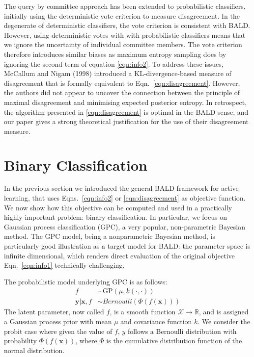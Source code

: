 \documentclass[twoside]{article}
\newcommand{\x}{\bm{x}}
\newcommand{\y}{\bm{y}}
\begin{document}
The query by committee approach has been extended to probabilistic classifiers\cite{EnglesonDagan1995}, initially using the deterministic vote criterion to measure disagreement. In the degenerate of deterministic classifiers, the vote criterion is consistent with BALD. However, using deterministic votes with with probabilistic classifiers means that we ignore the uncertainty of individual committee members. The vote criterion therefore introduces similar biases as maximum entropy sampling does by ignoring the second term of equation \eqref{eqn:info2}. To address these issues, McCallum and Nigam (1998) \cite{McCallumNigam1998} introduced a KL-divergence-based measure of disagreement that is formally equivalent to Eqn.\  \eqref{eqn:disagreement}. However, the authors did not appear to uncover the connection between the principle of maximal disagreement and minimising expected posterior entropy. In retrospect, the algorithm presented in \eqref{eqn:disagreement} is optimal in the BALD sense, and our paper gives a strong theoretical justification for the use of their disagreement measure.

\section{Binary Classification}\label{sec:GPC}

In the previous section we introduced the general BALD framework for active learning, that uses Eqns.\ \eqref{eqn:info2} or \eqref{eqn:disagreement} as objective function. We now show how this objective can be computed and used in a practically highly important problem: binary classification. In particular, we focus on Gaussian process classification (GPC), a very popular, non-parametric Bayesian method. The GPC model, being a nonparametric Bayesian method, is particularly good illustration as a target model for BALD: the parameter space is infinite dimensional, which renders direct evaluation of the original objective Eqn.\ \eqref{eqn:info1} technically challenging.

The probabilistic model underlying GPC is as follows:
\begin{align}
	f &\sim \mathrm{GP}(\mu,k(\cdot,\cdot))\label{GPC_prior}  \\
	\y\vert\x,f &\sim Bernoulli(\Phi(f(\x)))\label{GPC_likelihood} 
\end{align}
The latent parameter, now called $f$, is a smooth function $\mathcal{X}\rightarrow\mathbb{R}$, and is assigned a Gaussian process prior with mean $\mu$ and covariance function $k$. We consider the probit case where given the value of $f$, $y$ follows a Bernoulli distribution with probability $\Phi(f(\x))$, where $\Phi$ is the cumulative distribution function of the normal distribution.
\end{document}
